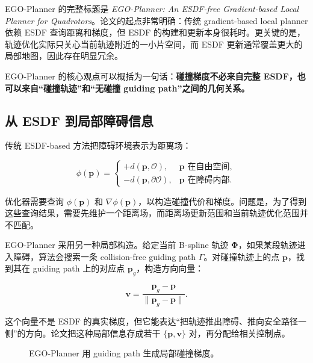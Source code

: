\documentclass[UTF8,a4paper,12pt]{ctexart}
\newcommand{\traj}{\boldsymbol{\Phi}}
\newcommand{\pos}{\mathbf{p}}
\begin{document}
EGO-Planner 的完整标题是 \textit{EGO-Planner: An ESDF-free Gradient-based Local Planner for Quadrotors}。论文的起点非常明确：传统 gradient-based local planner 依赖 ESDF 查询距离和梯度，但 ESDF 的构建和更新本身很耗时。更关键的是，轨迹优化实际只关心当前轨迹附近的一小片空间，而 ESDF 更新通常覆盖更大的局部地图，因此存在明显冗余。

EGO-Planner 的核心观点可以概括为一句话：\textbf{碰撞梯度不必来自完整 ESDF，也可以来自“碰撞轨迹”和“无碰撞 guiding path”之间的几何关系。}

\subsection{从 ESDF 到局部障碍信息}

传统 ESDF-based 方法把障碍环境表示为距离场：

\begin{equation}
  \phi(\pos)=
  \begin{cases}
  +d(\pos,\mathcal{O}), & \pos \text{ 在自由空间},\\
  -d(\pos,\partial\mathcal{O}), & \pos \text{ 在障碍内部}.
  \end{cases}
\end{equation}

优化器需要查询 $\phi(\pos)$ 和 $\nabla\phi(\pos)$，以构造碰撞代价和梯度。问题是，为了得到这些查询结果，需要先维护一个距离场，而距离场更新范围和当前轨迹优化范围并不匹配。

EGO-Planner 采用另一种局部构造。给定当前 B-spline 轨迹 $\traj$，如果某段轨迹进入障碍，算法会搜索一条 collision-free guiding path $\Gamma$。对碰撞轨迹上的点 $\pos$，找到其在 guiding path 上的对应点 $\pos_g$，构造方向向量：

\begin{equation}
  \mathbf{v}=\frac{\pos_g-\pos}{\|\pos_g-\pos\|}.
\end{equation}

这个向量不是 ESDF 的真实梯度，但它能表达“把轨迹推出障碍、推向安全路径一侧”的方向。论文把这种局部信息存成若干 $\{\pos,\mathbf{v}\}$ 对，再分配给相关控制点。

\begin{figure}[h]
\centering
{}
\caption{EGO-Planner 用 guiding path 生成局部碰撞梯度。}
\end{figure}
\end{document}
